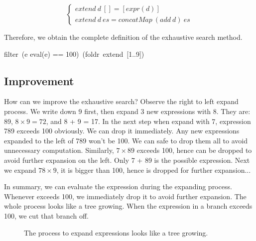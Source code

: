 \documentclass{article}
\begin{document}
\[
\begin{cases}
extend\ d\ [] = [expr(d)] \\
extend\ d\ es = concatMap\ (add\ d)\ es
\end{cases}
\]

Therefore, we obtain the complete definition of the exhaustive search method.

\be
filter\ (e \mapsto eval(e) == 100)\ (foldr\ extend\ [1..9])
\label{eq:puzzle100-basic}
\ee

\subsection{Improvement}

How can we improve the exhaustive search? Observe the right to left expand process. We write down 9 first, then expand 3 new expressions with 8. They are: 89, $8 \times 9 = 72$, and 8 + 9 = 17. In the next step when expand with 7, expression 789 exceeds 100 obviously. We can drop it immediately. Any new expressions expanded to the left of 789 won't be 100. We can safe to drop them all to avoid unnecessary computation. Similarly, $7 \times 89$ exceeds 100, hence can be dropped to avoid further expansion on the left. Only 7 + 89 is the possible expression. Next we expand $78 \times 9$, it is bigger than 100, hence is dropped for further expansion...

In summary, we can evaluate the expression during the expanding process. Whenever exceeds 100, we immediately drop it to avoid further expansion. The whole process looks like a tree growing. When the expression in a branch exceeds 100, we cut that branch off.

\begin{figure}[htbp]
\centering
{}
\caption{The process to expand expressions looks like a tree growing.}
\end{figure}
\end{document}

